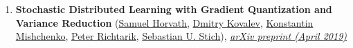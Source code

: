 \begin{enumerate}
\item \textbf{Stochastic Distributed Learning with Gradient Quantization and Variance Reduction} (\href{https://samuelhorvath.github.io}{\color{linkcolour}Samuel Horvath}, \href{https://www.dmitry-kovalev.com}{\color{linkcolour}Dmitry Kovalev}, \href{https://konstmish.github.io}{\color{linkcolour}Konstantin Mishchenko}, \href{https://richtarik.org}{\color{linkcolour}Peter Richtarik}, \href{https://sstich.ch}{\color{linkcolour}Sebastian U. Stich}), \href{https://arxiv.org/abs/1904.05115}{\em \color{black}arXiv preprint (April 2019)}
\end{enumerate}
